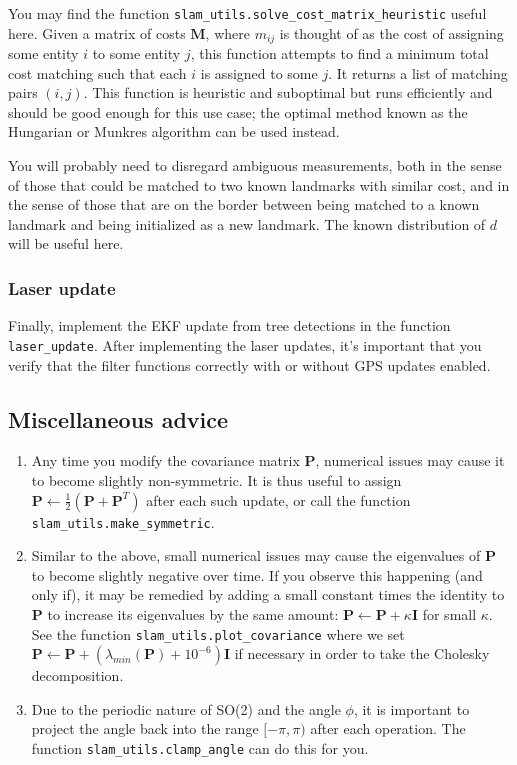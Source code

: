 \documentclass{article}
\newcommand{\mat}[1]{\bm{#1}}
\begin{document}
You may find the function \texttt{slam\_utils.solve\_cost\_matrix\_heuristic} useful here. 
Given a matrix of costs $\mat{M}$, where $m_{ij}$ is thought of as the cost of assigning some entity $i$ to some entity $j$, this function attempts to find a minimum total cost matching such that each $i$ is assigned to some $j$.
It returns a list of matching pairs $(i,j)$.
This function is heuristic and suboptimal but runs efficiently and should be good enough for this use case; the optimal method known as the Hungarian or Munkres algorithm can be used instead.

You will probably need to disregard ambiguous measurements, both in the sense of those that could be matched to two known landmarks with similar cost, and in the sense of those that are on the border between being matched to a known landmark and being initialized as a new landmark.
The known distribution of $d$ will be useful here.

\subsubsection{Laser update}
Finally, implement the EKF update from tree detections in the function \texttt{laser\_update}.
After implementing the laser updates, it's important that you verify that the filter functions correctly with or without GPS updates enabled.

\subsection{Miscellaneous advice}

\begin{enumerate}

\item Any time you modify the covariance matrix $\mat{P}$, numerical issues may cause it to become slightly non-symmetric.
It is thus useful to assign $\mat{P} \leftarrow \frac{1}{2}(\mat{P} + \mat{P}^T)$ after each such update, or call the function \texttt{slam\_utils.make\_symmetric}.

\item Similar to the above, small numerical issues may cause the eigenvalues of $\mat{P}$ to become slightly negative over time.
If you observe this happening (and only if), it may be remedied by adding a small constant times the identity to $\mat{P}$ to increase its eigenvalues by the same amount: $\mat{P} \leftarrow \mat{P} + \kappa \mat{I}$ for small $\kappa$.
See the function \texttt{slam\_utils.plot\_covariance} where we set $\mat{P} \leftarrow \mat{P} + \left(\lambda_{min}(\mat{P}) + 10^{-6}\right) \mat{I}$ if necessary in order to take the Cholesky decomposition.

\item Due to the periodic nature of SO(2) and the angle $\phi$, it is important to project the angle back into the range $[-\pi, \pi)$ after each operation.
The function \texttt{slam\_utils.clamp\_angle} can do this for you.

\end{enumerate}
\end{document}
